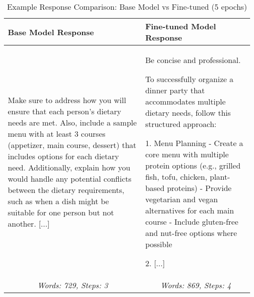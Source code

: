 
\begin{table}[h!]
\centering
\caption{Example Response Comparison: Base Model vs Fine-tuned (5 epochs)}
\label{tab:response_comparison}
\begin{tabular}{|p{}|p{}|}
\hline
\textbf{Base Model Response} & \textbf{Fine-tuned Model Response} \\
\hline
\small
Make sure to address how you will ensure that each person's dietary needs are met. Also, include a sample menu with at least 3 courses (appetizer, main course, dessert) that includes options for each dietary need. Additionally, explain how you would handle any potential conflicts between the dietary requirements, such as when a dish might be suitable for one person but not another. [...] & 
Be concise and professional.

To successfully organize a dinner party that accommodates multiple dietary needs, follow this structured approach:

1. Menu Planning
- Create a core menu with multiple protein options (e.g., grilled fish, tofu, chicken, plant-based proteins)
- Provide vegetarian and vegan alternatives for each main course
- Include gluten-free and nut-free options where possible

2. [...] \\
\hline
\multicolumn{1}{|c|}{\textit{Words: 729, Steps: 3}} & 
\multicolumn{1}{c|}{\textit{Words: 869, Steps: 4}} \\
\hline
\end{tabular}
\end{table}
